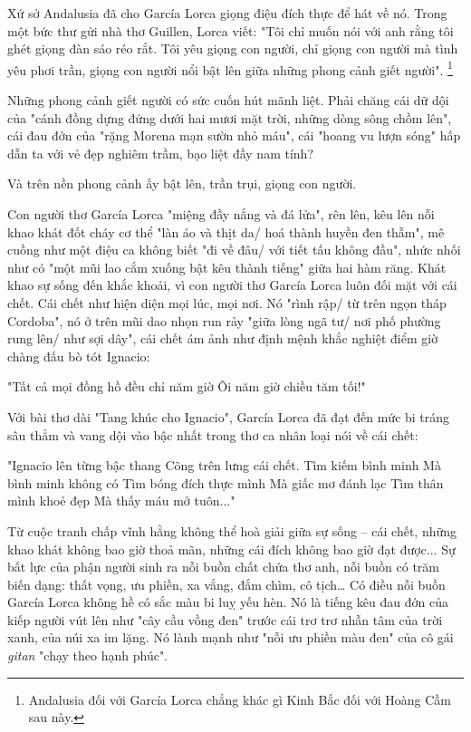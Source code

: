 \documentclass[../main.tex]{subfiles}
\begin{document}
\begin{multicols}{2}
Xứ sở Andalusia đã cho García Lorca giọng điệu đích thực để hát về nó. Trong một bức thư gửi nhà thơ Guillen, Lorca viết: "Tôi chỉ muốn nói với anh rằng tôi ghét giọng đàn sáo réo rắt. Tôi yêu giọng con người, chỉ giọng con người mà tình yêu phơi trần, giọng con người nổi bật lên giữa những phong cảnh giết người". \footnote{
Andalusia đối với García Lorca chẳng khác gì Kinh Bắc đối với Hoàng Cầm sau này.}  
 
Những phong cảnh giết người có sức cuốn hút mãnh liệt. Phải chăng cái dữ dội của "cánh đồng dựng đứng dưới hai mươi mặt trời, những dòng sông chồm lên", cái đau đớn của "rặng Morena mạn sườn nhỏ máu", cái "hoang vu lượn sóng" hấp dẫn ta với vẻ đẹp nghiêm trầm, bạo liệt đầy nam tính? 
 
Và trên nền phong cảnh ấy bật lên, trần trụi, giọng con người. 
 
Con người thơ García Lorca "miệng đầy nắng và đá lửa", rên lên, kêu lên nỗi khao khát đốt cháy cơ thể "làn áo và thịt da/ hoá thành huyền đen thẫm", mê cuồng như một điệu ca không biết "đi về đâu/ với tiết tấu không đầu", nhức nhối như có "một mũi lao cắm xuống bật kêu thành tiếng" giữa hai hàm răng. Khát khao sự sống đến khắc khoải, vì con người thơ García Lorca luôn đối mặt với cái chết. Cái chết như hiện diện mọi lúc, mọi nơi. Nó "rình rập/ từ trên ngọn tháp Cordoba", nó ở trên mũi dao nhọn run rảy "giữa lòng ngã tư/ nơi phố phường rung lên/ như sợi dây", cái chết ám ảnh như định mệnh khắc nghiệt điểm giờ chàng đấu bò tót Ignacio: 
\begin{blockquote}
        
"Tất cả mọi đồng hồ đều chỉ năm  giờ        
Ôi năm giờ chiều tăm tối!" 

\end{blockquote}
 
Với bài thơ dài "Tang khúc cho Ignacio", García Lorca đã đạt đến mức bi tráng sâu thẳm và vang dội vào bậc nhất trong thơ ca nhân loại nói về cái chết: 
\begin{blockquote}
        
"Ignacio lên từng bậc thang        
Cõng trên lưng cái chết.        
Tìm kiếm bình minh        
Mà bình minh không có        
Tìm bóng đích thực mình        
Mà giấc mơ đánh lạc        
Tìm thân mình khoẻ đẹp        
Mà thấy máu mở tuôn..." 

\end{blockquote}
 
Từ cuộc tranh chấp vĩnh hằng không thể hoà giải giữa sự sống – cái chết, những khao khát không bao giờ thoả mãn, những cái đích không bao giờ đạt được... Sự bất lực của phận người sinh ra nỗi buồn chất chứa thơ anh, nỗi buồn có trăm biến dạng: thất vọng, ưu phiền, xa vắng, đắm chìm, cô tịch… Có điều nỗi buồn García Lorca không hề có sắc màu bi luỵ yếu hèn. Nó là tiếng kêu đau đớn của kiếp người vút lên như "cây cầu vồng đen" trước cái trơ trơ nhẫn tâm của trời xanh, của núi xa im lặng. Nó lành mạnh như "nỗi ưu phiền màu đen" của cô gái \textit{gitan} "chạy theo hạnh phúc". 
 

\end{multicols}
\end{document}
